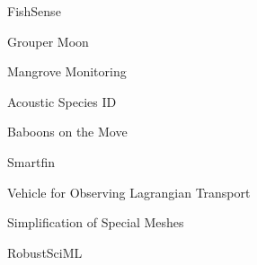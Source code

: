 \item FishSense
\item Grouper Moon
\item Mangrove Monitoring
\item Acoustic Species ID
\item Baboons on the Move
\item Smartfin
\item Vehicle for Observing Lagrangian Transport
\item Simplification of Special Meshes
\item RobustSciML
